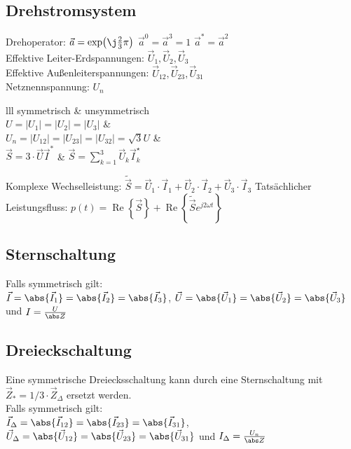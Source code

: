 \documentclass[european]{latex4ei_sheet}
\begin{document}
		\subsection{Drehstromsystem}
		Drehoperator: $\vec a = \exp\bigl(\j \frac{2}{3} \pi \bigr)$ \qquad $\vec a^0 = \vec a^3 = 1$ \quad $\vec a^* = \vec a^2$\\
		
		
		Effektive Leiter-Erdspannungen: $\vec U_1,\vec U_2,\vec U_3$\\
		Effektive Außenleiterspannungen: $\vec U_{12},\vec U_{23},\vec U_{31}$\\
		Netznennspannung: $U_n$\\
		
		
		\begin{tablebox}{lll}
			symmetrisch & unsymmetrisch\\
			$U = |U_1| = |U_2| = |U_3|$ & \\
		 	$U_n = |U_{12}| = |U_{23}| = |U_{32}| = \sqrt{3} U$ & \\
		 	$\vec S = 3 \cdot \vec U\vec I^*$ & $\vec S = \sum_{k=1}^3\vec U_k\vec I_k^\star$\\
		\end{tablebox}
		
		Komplexe Wechselleistung: $\tilde{\vec S} = \vec U_1 \cdot \vec I_1 + \vec U_2 \cdot \vec I_2 + \vec U_3 \cdot \vec I_3$
		Tatsächlicher Leistungsfluss: $p(t) = \operatorname{Re} \left\{ \vec S \right\} + \operatorname{Re} \left\{\tilde{\vec S} e^{j 2 \omega t} \right\}$
	\subsection{Sternschaltung}
	Falls symmetrisch gilt:\\
	 $\vec I = \abs{\vec I_1} = \abs{\vec I_2} = \abs{\vec I_3}$, $\vec U = \abs{\vec U_1} = \abs{\vec U_2} = \abs{\vec U_3}$ und $I=\frac{U}{\abs Z}$
	\subsection{Dreieckschaltung}
	Eine symmetrische Dreiecksschaltung kann durch eine Sternschaltung mit $\vec Z_*=1/3 \cdot \vec Z_\Delta$ ersetzt werden.\\
	Falls symmetrisch gilt:\\
	$\vec I_\Delta = \abs{\vec I_{12}} = \abs{\vec I_{23}} = \abs{\vec I_{31}}$, $\vec U_\Delta = \abs{\vec U_{12}} = \abs{\vec U_{23}} = \abs{\vec U_{31}}$ und $I_\Delta=\frac{U_n}{\abs Z}$
\end{document}
